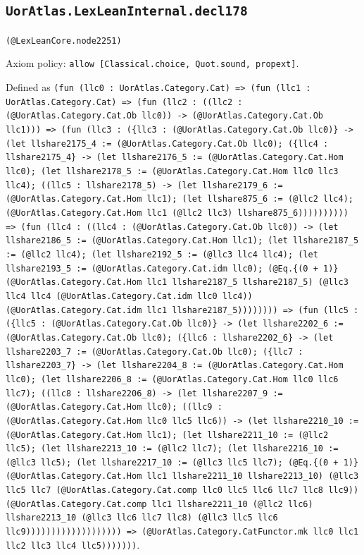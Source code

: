 \documentclass[11pt]{article}
\begin{document}
\subsection*{\texttt{UorAtlas.LexLeanInternal.decl178}}
\noindent\texttt{(@LexLeanCore.node2251)}\par
\noindent Axiom policy: \texttt{allow [Classical.choice, Quot.sound, propext]}.\par
\noindent Defined as \texttt{(fun (llc0 : UorAtlas.Category.Cat) => (fun (llc1 : UorAtlas.Category.Cat) => (fun (llc2 : ((llc2 : (@UorAtlas.Category.Cat.Ob llc0)) -> (@UorAtlas.Category.Cat.Ob llc1))) => (fun (llc3 : (\{llc3 : (@UorAtlas.Category.Cat.Ob llc0)\} -> (let llshare2175\_4 := (@UorAtlas.Category.Cat.Ob llc0); (\{llc4 : llshare2175\_4\} -> (let llshare2176\_5 := (@UorAtlas.Category.Cat.Hom llc0); (let llshare2178\_5 := (@UorAtlas.Category.Cat.Hom llc0 llc3 llc4); ((llc5 : llshare2178\_5) -> (let llshare2179\_6 := (@UorAtlas.Category.Cat.Hom llc1); (let llshare875\_6 := (@llc2 llc4); (@UorAtlas.Category.Cat.Hom llc1 (@llc2 llc3) llshare875\_6)))))))))) => (fun (llc4 : ((llc4 : (@UorAtlas.Category.Cat.Ob llc0)) -> (let llshare2186\_5 := (@UorAtlas.Category.Cat.Hom llc1); (let llshare2187\_5 := (@llc2 llc4); (let llshare2192\_5 := (@llc3 llc4 llc4); (let llshare2193\_5 := (@UorAtlas.Category.Cat.idm llc0); (@Eq.\{(0 + 1)\} (@UorAtlas.Category.Cat.Hom llc1 llshare2187\_5 llshare2187\_5) (@llc3 llc4 llc4 (@UorAtlas.Category.Cat.idm llc0 llc4)) (@UorAtlas.Category.Cat.idm llc1 llshare2187\_5)))))))) => (fun (llc5 : (\{llc5 : (@UorAtlas.Category.Cat.Ob llc0)\} -> (let llshare2202\_6 := (@UorAtlas.Category.Cat.Ob llc0); (\{llc6 : llshare2202\_6\} -> (let llshare2203\_7 := (@UorAtlas.Category.Cat.Ob llc0); (\{llc7 : llshare2203\_7\} -> (let llshare2204\_8 := (@UorAtlas.Category.Cat.Hom llc0); (let llshare2206\_8 := (@UorAtlas.Category.Cat.Hom llc0 llc6 llc7); ((llc8 : llshare2206\_8) -> (let llshare2207\_9 := (@UorAtlas.Category.Cat.Hom llc0); ((llc9 : (@UorAtlas.Category.Cat.Hom llc0 llc5 llc6)) -> (let llshare2210\_10 := (@UorAtlas.Category.Cat.Hom llc1); (let llshare2211\_10 := (@llc2 llc5); (let llshare2213\_10 := (@llc2 llc7); (let llshare2216\_10 := (@llc3 llc5); (let llshare2217\_10 := (@llc3 llc5 llc7); (@Eq.\{(0 + 1)\} (@UorAtlas.Category.Cat.Hom llc1 llshare2211\_10 llshare2213\_10) (@llc3 llc5 llc7 (@UorAtlas.Category.Cat.comp llc0 llc5 llc6 llc7 llc8 llc9)) (@UorAtlas.Category.Cat.comp llc1 llshare2211\_10 (@llc2 llc6) llshare2213\_10 (@llc3 llc6 llc7 llc8) (@llc3 llc5 llc6 llc9))))))))))))))))))) => (@UorAtlas.Category.CatFunctor.mk llc0 llc1 llc2 llc3 llc4 llc5)))))))}.\par
\end{document}

